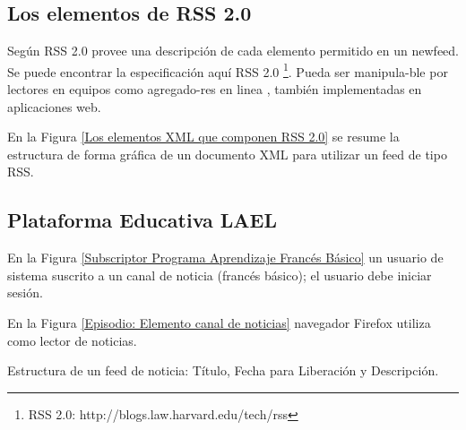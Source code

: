 \subsection{Los elementos de RSS 2.0}

Según \cite{johnson2006rss} RSS 2.0 provee una descripción de cada elemento
permitido en un newfeed. Se puede encontrar la especificación aquí RSS 2.0 
\footnote{RSS 2.0: http://blogs.law.harvard.edu/tech/rss}. Pueda ser
manipula-ble por lectores en equipos como agregado-res en linea
, también implementadas en aplicaciones web.

En la Figura \ref{Los elementos XML que componen RSS 2.0} se resume la
estructura de forma gráfica de un documento XML para utilizar un feed de
tipo RSS. \cite{johnson2006rss}

\begin{minipage}{1.0\linewidth}
	\centering
	\label{Los elementos XML que componen RSS 2.0}
\end{minipage}

\subsection{Plataforma Educativa LAEL}

En la Figura \ref{Subscriptor Programa Aprendizaje Francés Básico} un
usuario de sistema suscrito a un canal de noticia (francés básico); el
usuario debe iniciar sesión. 

\begin{minipage}{1.0\linewidth}
	\centering
	\label{Subscriptor Programa Aprendizaje Francés Básico}
\end{minipage}

En la Figura \ref{Episodio: Elemento canal de noticias} navegador Firefox
utiliza como lector de noticias.

Estructura de un feed de noticia: Título, Fecha para Liberación y Descripción.
 
\begin{minipage}{1.0\linewidth}
	\centering
	\label{Episodio: Elemento canal de noticias}
\end{minipage}

